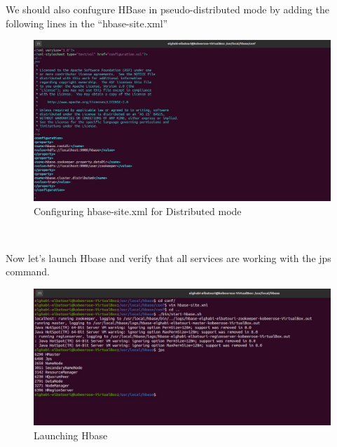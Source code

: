 \begin{spacing}{1.2}
\par We should also confugure HBase in pseudo-distributed mode by adding the following lines in the “hbase-site.xml”
\\
\begin{figure}[!htb] 
\begin{center} 
\includegraphics[width=1\linewidth]{Pictures/HBase/Configuring Hbase in Standalone & Pseudo-distributed mode/Configuring Hbase in Pseudo-distributed mode/Configuring hbase-site.xml for Distributed mode} 
\end{center} 
\caption{Configuring hbase-site.xml for Distributed mode} 
\end{figure}  \FloatBarrier
\\

\par Now let's launch Hbase and verify that all services are working with the jps command.
\\
\begin{figure}[!htb] 
\begin{center} 
\includegraphics[width=1\linewidth]{Pictures/HBase/Configuring Hbase in Standalone & Pseudo-distributed mode/Configuring Hbase in Pseudo-distributed mode/Launching Hbase} 
\end{center} 
\caption{Launching Hbase} 
\end{figure}  \FloatBarrier
\\


\end{spacing}
